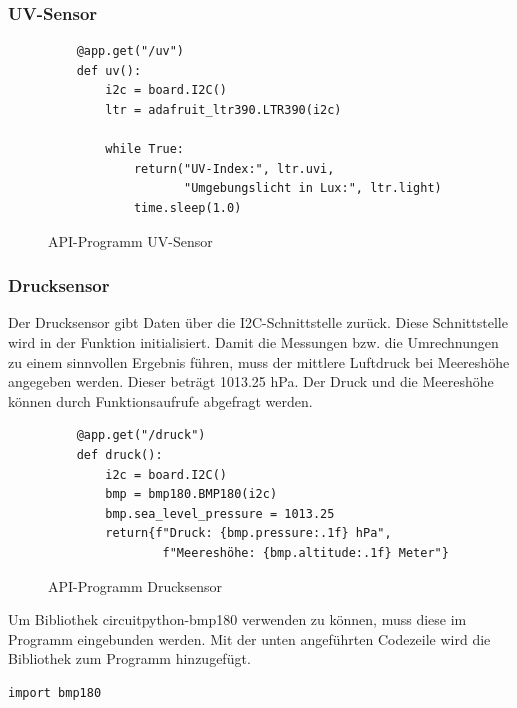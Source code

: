 \subsubsection{UV-Sensor}\label{API-UVS}
\begin{figure}[H]
    \centering
    \begin{verbatim}
    @app.get("/uv")
    def uv():
        i2c = board.I2C()
        ltr = adafruit_ltr390.LTR390(i2c)

        while True:
            return("UV-Index:", ltr.uvi, 
                   "Umgebungslicht in Lux:", ltr.light)
            time.sleep(1.0)
    \end{verbatim}
    \caption{API-Programm UV-Sensor}
\end{figure}
\newpage

\subsubsection{Drucksensor}\label{sec:API-Druck}
Der Drucksensor gibt Daten über die I2C-Schnittstelle zurück. Diese Schnittstelle wird in der Funktion initialisiert. Damit die Messungen bzw. die Umrechnungen zu einem sinnvollen Ergebnis führen, muss der mittlere Luftdruck bei Meereshöhe angegeben werden. Dieser beträgt 1013.25 hPa. Der Druck und die Meereshöhe können durch Funktionsaufrufe abgefragt werden. 
\vspace{3mm}
\begin{figure}[H]
    \centering
    \begin{verbatim}
    @app.get("/druck")
    def druck():
        i2c = board.I2C()
        bmp = bmp180.BMP180(i2c)
        bmp.sea_level_pressure = 1013.25
        return{f"Druck: {bmp.pressure:.1f} hPa", 
                f"Meereshöhe: {bmp.altitude:.1f} Meter"} 
    \end{verbatim}
    \caption{API-Programm Drucksensor}
\end{figure}

Um Bibliothek circuitpython-bmp180 verwenden zu können, muss diese im Programm eingebunden werden. Mit der unten angeführten Codezeile wird die Bibliothek zum Programm hinzugefügt. 
\begin{verbatim}
import bmp180
\end{verbatim}


